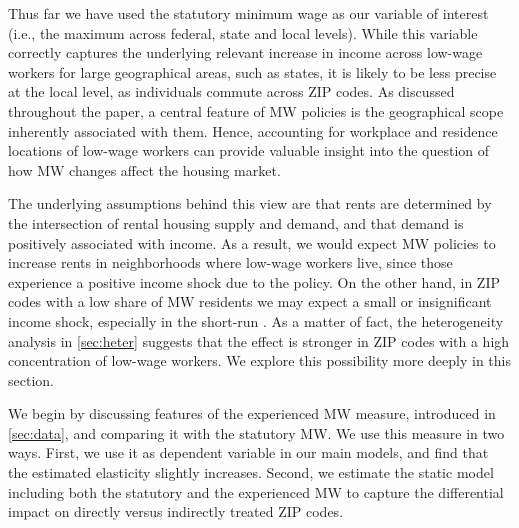 
Thus far we have used the statutory minimum wage as our variable of interest (i.e., 
the maximum across federal, state and local levels). While this variable correctly 
captures the underlying relevant increase in income across low-wage workers for large
geographical areas, such as states, it is likely to be less precise at the local level, 
as individuals commute across ZIP codes. As discussed throughout the paper, a central 
feature of MW policies is the geographical scope inherently associated with them. 
Hence, accounting for workplace and residence locations of low-wage workers can 
provide valuable insight into the question of how MW changes affect the housing 
market. 

The underlying assumptions behind this view are that rents are determined by the 
intersection of rental housing supply and demand, and that demand is positively 
associated with income. As a result, we would expect MW policies to increase 
rents in neighborhoods where low-wage workers live, since those experience a positive
income shock due to the policy. On the other hand, in ZIP codes with a low share 
of MW residents we may expect a small or insignificant income shock, especially 
in the short-run \parencite[][suggests that MW increases in the 
restaurant industry are passed to consumers via higher prices. Thus, these events may 
be associated with a decrease in disposable income in those zipcodes]{Allegretto2018}. 
As a matter of fact, the heterogeneity analysis in \autoref{sec:heter} suggests that 
the effect is stronger in ZIP codes with a high concentration of low-wage workers. 
We explore this possibility more deeply in this section.

We begin by discussing features of the experienced MW measure, introduced in 
\autoref{sec:data}, and comparing it with the statutory MW. We use this measure in two 
ways. First, we use it as dependent variable in our main models, and find that the 
estimated elasticity slightly increases. Second, we estimate the static model including 
both the statutory and the experienced MW to capture the differential impact on 
directly versus indirectly treated ZIP codes.

